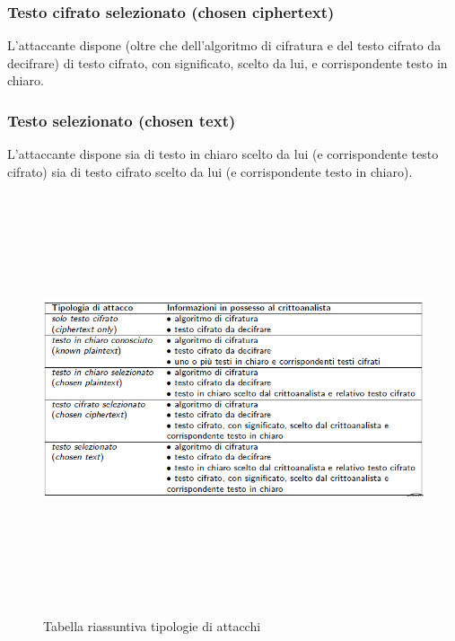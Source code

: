 \subsubsection{Testo cifrato selezionato (chosen ciphertext)}
L'attaccante dispone (oltre che dell'algoritmo di cifratura e del testo cifrato da decifrare) di testo cifrato, con significato, scelto da lui, e corrispondente testo in chiaro.
\subsubsection{Testo selezionato (chosen text)}
L'attaccante dispone sia di testo in chiaro scelto da lui (e corrispondente testo cifrato) sia di testo cifrato scelto da lui (e corrispondente testo in chiaro).
\begin{figure}[htbp]
	\centering%
	\subfigure%
	{\includegraphics[height=12cm, width=13cm, keepaspectratio]{Immagini/introduzione/tab_attacchi_cifrari.png}}
	\caption{Tabella riassuntiva tipologie di attacchi \label{fig:tab_attacchi_cifrari}} 	
\end{figure}
